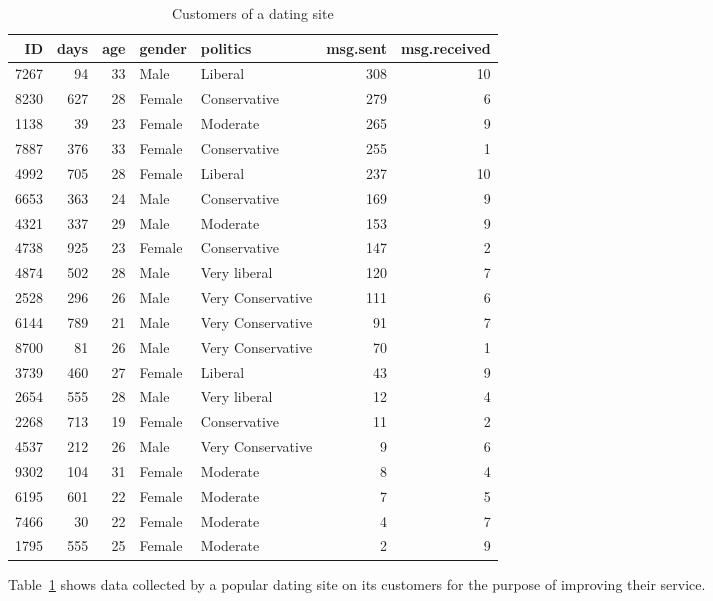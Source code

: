 \documentclass[11pt]{exam}
\begin{document}
\begin{questions}
\begin{table}[ht]
\begin{center}
\begin{tabular}{rrrllrr}
  \hline
ID & days & age & gender & politics & msg.sent & msg.received \\ 
  \hline
7267 & 94 & 33 & Male & Liberal & 308 & 10 \\ 
  8230 & 627 & 28 & Female & Conservative & 279 & 6 \\ 
  1138 & 39 & 23 & Female & Moderate & 265 & 9 \\ 
  7887 & 376 & 33 & Female & Conservative & 255 & 1 \\ 
  4992 & 705 & 28 & Female & Liberal & 237 & 10 \\ 
  6653 & 363 & 24 & Male & Conservative & 169 & 9 \\ 
  4321 & 337 & 29 & Male & Moderate & 153 & 9 \\ 
  4738 & 925 & 23 & Female & Conservative & 147 & 2 \\ 
  4874 & 502 & 28 & Male & Very liberal & 120 & 7 \\ 
  2528 & 296 & 26 & Male & Very Conservative & 111 & 6 \\ 
  6144 & 789 & 21 & Male & Very Conservative & 91 & 7 \\ 
  8700 & 81 & 26 & Male & Very Conservative & 70 & 1 \\ 
  3739 & 460 & 27 & Female & Liberal & 43 & 9 \\ 
  2654 & 555 & 28 & Male & Very liberal & 12 & 4 \\ 
  2268 & 713 & 19 & Female & Conservative & 11 & 2 \\ 
  4537 & 212 & 26 & Male & Very Conservative & 9 & 6 \\ 
  9302 & 104 & 31 & Female & Moderate & 8 & 4 \\ 
  6195 & 601 & 22 & Female & Moderate & 7 & 5 \\ 
  7466 & 30 & 22 & Female & Moderate & 4 & 7 \\ 
  1795 & 555 & 25 & Female & Moderate & 2 & 9 \\ 
   \hline
\end{tabular}
\caption{Customers of a dating site}
\label{tab:okcupid}
\end{center}
\end{table}%

  Table~\ref{tab:okcupid} shows data collected by a popular dating site on
  its customers for the purpose of improving their service.
  \question
  \begin{parts}

\end{parts}
\end{questions}
\end{document}
